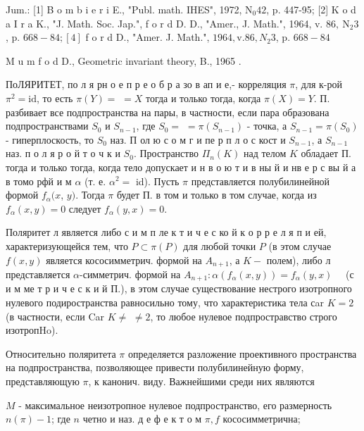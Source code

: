 \documentclass[10pt]{article}
\begin{document}
Jum.: [1] B o m b i e r i E., "Publ. math. IHES", 1972, $\mathrm{N}_{0} 42$, p. 447-95; [2] K o d a I r a K., "J. Math. Soc. Jap.", f o r d D. D., "Amer., J. Math.", 1964, v. $86, \mathrm{~N}_{2} 3$, p. $668-84 ;[4]$ f o r d D., "Amer. J. Math.", $1964, \mathrm{v} .86, N_{2} 3$, p. $668-84$

M u m f o d D., Geometric invariant theory, B., 1965 .



ПоЛЯРИТЕТ, по л я рн о е п р е о б р а зо в ап и е,- корреляция $\pi$, для к-рой $\pi^{2}=\mathrm{id}$, то есть $\pi(Y)=$ $=X$ тогда и только тогда, когда $\pi(X)=Y$. П. разбивает все подпространства на пары, в частности, если пара образована подпространствами $S_{0}$ и $S_{n-1}$, где $S_{0}=$ $=\pi\left(S_{n-1}\right)$ - точка, а $S_{n-1}=\pi\left(S_{0}\right)$ - гиперплоскость, то $S_{0}$ наз. П ол ю с о м г и пе р п л о с кост и $S_{n-1}$, а $S_{n-1}$ наз. п о л я р о й т о ч к и $S_{0}$. Пространство $\Pi_{n}(K)$ над телом $K$ обладает П. тогда и только тогда, когда тело допускает и н в о ю т и в ны й и нв е р с вы й а в томо рфй и м $\alpha$ (т. е. $\alpha^{2}=$ id). Пусть $\pi$ представляется полубилинейной формой $f_{\alpha}(x$, $y)$. Тогда $\pi$ будет П. в том и только в том случае, когда из $f_{\alpha}(x, y)=0$ следует $f_{\alpha}(y, x)=0$.



Поляритет л является либо с и м п ле к т и ч е с ко й к о р р е л я п и ей, характеризующейся тем, что $P \subset \pi(P)$ для любой точки $P$ (в этом случае $f(x, y)$ является кососимметрич. формой на $A_{n+1}$, а $K-$ полем), либо л представляется $\alpha$-симметрич. формой на $A_{n+1}: \alpha\left(f_{\alpha}(x, y)\right)=f_{\alpha}(y, x) \quad$ (с и м ме т р и ч е с к и й П.), в этом случае существование нестрого изотропного нулевого подиространства равносильно тому, что характеристика тела сar $K=2$ (в частности, если Car $K \neq$ $\neq 2$, то любое нулевое подпростравство строго изотропHo).



Относительно поляритета $\pi$ определяется разложение проективного пространства на подпространства, позволяющее привести полубилинейную форму, представляющую $\pi$, к канонич. виду. Важнейшими среди них являются



$M$ - максимальное неизотропное нулевое подпространство, его размерность $n(\pi)-1$; где $n$ четно и наз. д е ф е к т о м $\pi, f$ кососимметрична;
\end{document}
